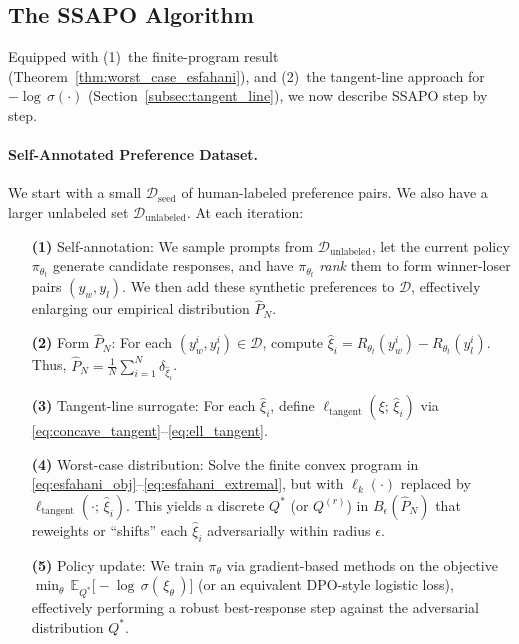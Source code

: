 \subsection{The SSAPO Algorithm}
\label{subsec:ssapo_algorithm}

Equipped with (1)~the \citet{Esfahani2018DataDrivenDR} finite-program result 
(Theorem~\ref{thm:worst_case_esfahani}), and 
(2)~the tangent-line approach for $-\log\,\sigma(\cdot)$ 
(Section~\ref{subsec:tangent_line}), 
we now describe SSAPO step by step.

\paragraph{Self-Annotated Preference Dataset.}
We start with a small \(\mathcal{D}_{\text{seed}}\) of human-labeled preference pairs.  
We also have a larger unlabeled set \(\mathcal{D}_{\text{unlabeled}}\).  At each iteration:

\begin{enumerate}
     \item[\textbf{(1)}]
      Self-annotation:
      We sample prompts from $\mathcal{D}_{\text{unlabeled}}$, let the current policy 
      $\pi_{\theta_t}$ generate candidate responses, and have $\pi_{\theta_t}$ 
      \emph{rank} them to form winner-loser pairs $(y_w,y_l)$.  We then add these 
      synthetic preferences to $\mathcal{D}$, effectively enlarging 
      our empirical distribution $\hat{P}_N$.
    
    \item[\textbf{(2)}] 
      Form $\hat{P}_N$:
      For each $(y_w^i,y_l^i)\in \mathcal{D}$, compute 
      $\hat{\xi}_i = R_{\theta_t}(y_w^i)-R_{\theta_t}(y_l^i)$.  
      Thus, $\hat{P}_N = \tfrac1N\sum_{i=1}^N \delta_{\hat{\xi}_i}$.

    \item[\textbf{(3)}] 
      Tangent-line surrogate:
      For each $\hat{\xi}_i$, define 
      $\ell_{\text{tangent}}(\xi;\,\hat{\xi}_i)$ 
      via \eqref{eq:concave_tangent}--\eqref{eq:ell_tangent}.

    \item[\textbf{(4)}] 
      Worst-case distribution:
      Solve the finite convex program in 
      \eqref{eq:esfahani_obj}--\eqref{eq:esfahani_extremal}, 
      but with $\ell_k(\cdot)$ replaced by 
      $\ell_{\text{tangent}}(\cdot;\,\hat{\xi}_i)$.  
      This yields a discrete $Q^*$ (or $Q^{(r)}$) in $B_\epsilon(\hat{P}_N)$ 
      that reweights or “shifts” each $\hat{\xi}_i$ adversarially within radius $\epsilon$.

    \item[\textbf{(5)}] 
      Policy update:
      We train $\pi_{\theta}$ via gradient-based methods on the objective
      $\min_{\theta}\,\mathbb{E}_{Q^*}\bigl[-\!\log\,\sigma(\,\xi_{\theta}\,)\bigr]$
      (or an equivalent DPO-style logistic loss), effectively performing 
      a robust best-response step against the adversarial distribution $Q^*$.
\end{enumerate}

